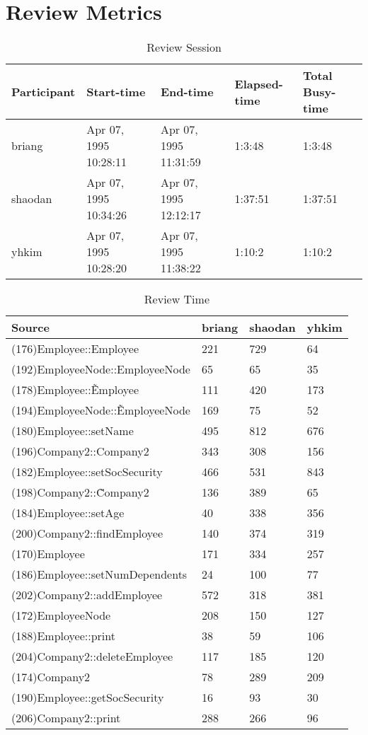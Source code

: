 \section{Review Metrics}
\begin{table}[hb]
\begin{center}
\begin{tabular}{|l|l|l|l|l|}
\hline
Participant & Start-time & End-time & Elapsed-time & Total Busy-time \\
\hline
briang & Apr 07, 1995 10:28:11 & Apr 07, 1995 11:31:59 & 1:3:48 & 1:3:48 \\
shaodan & Apr 07, 1995 10:34:26 & Apr 07, 1995 12:12:17 & 1:37:51 & 1:37:51 \\
yhkim & Apr 07, 1995 10:28:20 & Apr 07, 1995 11:38:22 & 1:10:2 & 1:10:2 \\
\hline
\end{tabular}
\end{center}
\caption{Review Session}
\end{table}


\begin{table}[hb]
\begin{center}
\begin{tabular}{|l|l|l|l|}
\hline
Source & briang & shaodan & yhkim\\
\hline
(176)Employee::Employee & 221 & 729 & 64\\
(192)EmployeeNode::EmployeeNode & 65 & 65 & 35\\
(178)Employee::\~Employee & 111 & 420 & 173\\
(194)EmployeeNode::\~EmployeeNode & 169 & 75 & 52\\
(180)Employee::setName & 495 & 812 & 676\\
(196)Company2::Company2 & 343 & 308 & 156\\
(182)Employee::setSocSecurity & 466 & 531 & 843\\
(198)Company2::\~Company2 & 136 & 389 & 65\\
(184)Employee::setAge & 40 & 338 & 356\\
(200)Company2::findEmployee & 140 & 374 & 319\\
(170)Employee & 171 & 334 & 257\\
(186)Employee::setNumDependents & 24 & 100 & 77\\
(202)Company2::addEmployee & 572 & 318 & 381\\
(172)EmployeeNode & 208 & 150 & 127\\
(188)Employee::print & 38 & 59 & 106\\
(204)Company2::deleteEmployee & 117 & 185 & 120\\
(174)Company2 & 78 & 289 & 209\\
(190)Employee::getSocSecurity & 16 & 93 & 30\\
(206)Company2::print & 288 & 266 & 96\\
\hline
\end{tabular}
\end{center}
\caption{Review Time}
\end{table}


